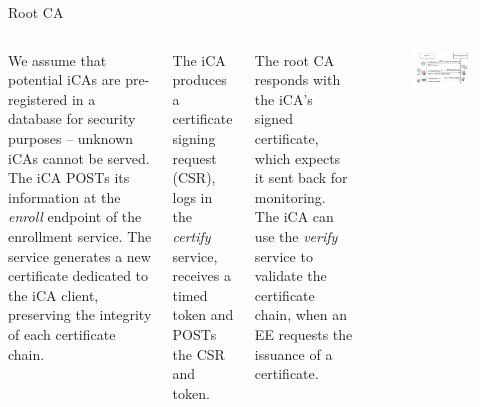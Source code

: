 \documentclass[10pt]{beamer}
\begin{document}
\begin{frame}[allowframebreaks]{Root CA}

	\medskip

	\begin{columns}[T]	
		
		We assume that potential iCAs are pre-registered in a database for security purposes -- unknown iCAs cannot be served. The iCA \textsc{POST}s its information at the \textit{enroll} endpoint of the enrollment service. The service generates a new certificate dedicated to the iCA client, preserving the integrity of each certificate chain.
		\hfill\break 
		
		The iCA produces a certificate signing request (CSR), logs in the \textit{certify} service, receives a timed token and \textsc{POST}s the CSR and token. 
		
		The root CA responds with the iCA's signed certificate, which expects it sent back for monitoring. The iCA can use the \textit{verify} service to validate the certificate chain, when an EE requests the issuance of a certificate.
		
		\medskip 
		
		\begin{figure}
		\centering
		\includegraphics[width=\textwidth]{images/CAendpoints.drawio.pdf}
		\end{figure}
		\smallskip
	\end{columns}

\end{frame}
\end{document}
